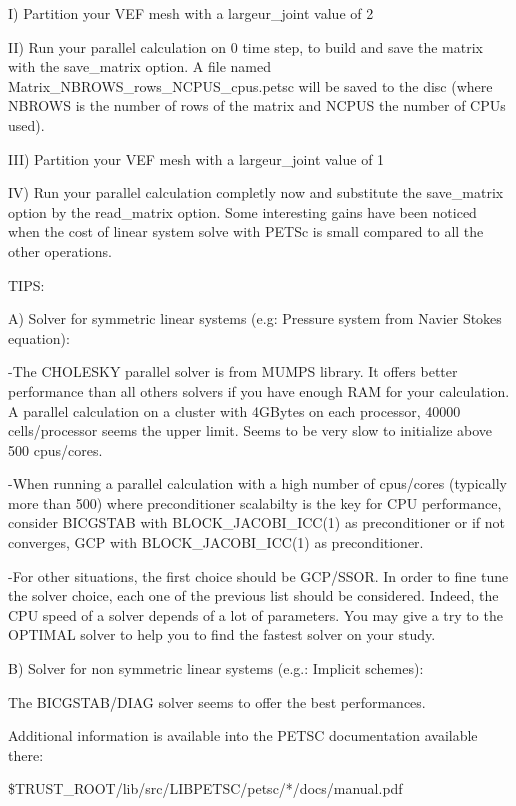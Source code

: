 I) Partition your VEF mesh with a largeur\_joint value of 2

II) Run your parallel calculation on 0 time step, to build and save the matrix with the save\_matrix option. A file named Matrix\_NBROWS\_rows\_NCPUS\_cpus.petsc will be saved to the disc (where NBROWS is the number of rows of the matrix and NCPUS the number of CPUs used). 

III) Partition your VEF mesh with a largeur\_joint value of 1

IV) Run your parallel calculation completly now and substitute the save\_matrix option by the read\_matrix option. Some interesting gains have been noticed when the cost of linear system solve with PETSc is small compared to all the other operations. 





TIPS:

A) Solver for symmetric linear systems (e.g: Pressure system from Navier Stokes equation):

-The CHOLESKY parallel solver is from MUMPS library. It offers better performance than all others solvers if you have enough RAM for your calculation. A parallel calculation on a cluster with 4GBytes on each processor, 40000 cells/processor seems the upper limit. Seems to be very slow to initialize above 500 cpus/cores.



-When running a parallel calculation with a high number of cpus/cores (typically more than 500) where preconditioner scalabilty is the key for CPU performance, consider BICGSTAB with BLOCK\_JACOBI\_ICC(1) as preconditioner or if not converges, GCP with BLOCK\_JACOBI\_ICC(1) as preconditioner.



-For other situations, the first choice should be GCP/SSOR. In order to fine tune the solver choice, each one of the previous list should be considered. Indeed, the CPU speed of a solver depends of a lot of parameters. You may give a try to the OPTIMAL solver to help you to find the fastest solver on your study. 



B) Solver for non symmetric linear systems (e.g.: Implicit schemes):

The BICGSTAB/DIAG solver seems to offer the best performances.



Additional information is available into the PETSC documentation available there:

 \$TRUST\_ROOT/lib/src/LIBPETSC/petsc/*/docs/manual.pdf
